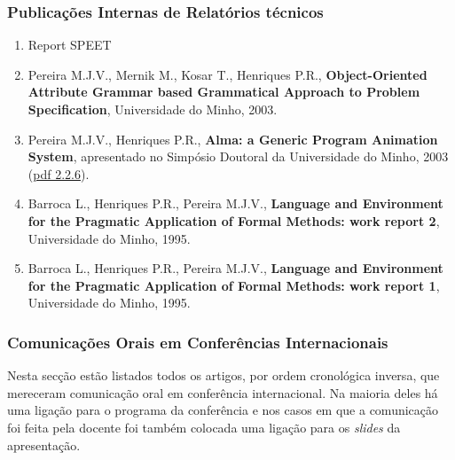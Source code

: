 \documentclass[11pt]{article}
\begin{document}
\subsubsection{Publicações Internas de Relatórios técnicos} 
\begin{enumerate}  
\item {Report SPEET}
\item {Pereira M.J.V., Mernik M., Kosar T., Henriques P.R., {\bf{ Object-Oriented Attribute Grammar based Grammatical Approach to Problem Specification}}, Universidade do Minho, 2003.}
\item {Pereira M.J.V., Henriques P.R., {\bf{ Alma: a Generic Program Animation System}}, apresentado no Simpósio Doutoral da Universidade do Minho, 2003 (\href{run:Publicacoes/ArtigoSimDoutoral.pdf}{pdf 2.2.6}).}
\item {Barroca L., Henriques P.R., Pereira M.J.V., {\bf{ Language and Environment for the Pragmatic Application of Formal Methods: work report 2}}, Universidade do Minho, 1995. }
\item {Barroca L., Henriques P.R., Pereira M.J.V., {\bf{ Language and Environment for the Pragmatic Application of Formal Methods: work report 1}}, Universidade do Minho, 1995. }
\end{enumerate} 


\subsubsection{Comunicações Orais em Conferências Internacionais}

Nesta secção estão listados todos os artigos, por ordem cronológica inversa, que mereceram comunicação oral em conferência internacional.  Na maioria deles há uma ligação para o programa da conferência e nos casos em que a comunicação foi feita pela docente foi também colocada uma ligação para os {\em{ slides}} da apresentação.
\end{document}
